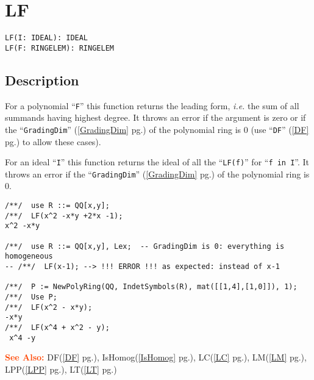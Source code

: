 \documentclass[a4paper]{mybook}
\newenvironment{command}{}{} %
\newcommand\SeeAlso{\par\textcolor{OrangeRed}{\textbf{\large See Also: }}}
\begin{document}
\section{LF}
\label{LF}
\begin{command} %


\begin{Verbatim}[label=syntax, rulecolor=\color{MidnightBlue},
frame=single]
LF(I: IDEAL): IDEAL
LF(F: RINGELEM): RINGELEM
\end{Verbatim}


\subsection*{Description}

For a polynomial ``\verb&F&'' this function returns the leading form, \textit{i.e.} the
sum of all summands having highest degree.  It throws an error if the
argument is zero or if the ``\verb&GradingDim&'' (\ref{GradingDim} pg.\pageref{GradingDim}) of the polynomial
ring is 0 (use ``\verb&DF&'' (\ref{DF} pg.\pageref{DF}) to allow these cases).
\par 
For an ideal ``\verb&I&'' this function returns the ideal of all the ``\verb&LF(f)&''
for ``\verb&f in I&''.  It throws an error if the ``\verb&GradingDim&'' (\ref{GradingDim} pg.\pageref{GradingDim}) of the polynomial
ring is 0.
\begin{Verbatim}[label=example, rulecolor=\color{PineGreen}, frame=single]
/**/  use R ::= QQ[x,y];
/**/  LF(x^2 -x*y +2*x -1);
x^2 -x*y

/**/  use R ::= QQ[x,y], Lex;  -- GradingDim is 0: everything is homogeneous
-- /**/  LF(x-1); --> !!! ERROR !!! as expected: instead of x-1

/**/  P := NewPolyRing(QQ, IndetSymbols(R), mat([[1,4],[1,0]]), 1);
/**/  Use P;
/**/  LF(x^2 - x*y);
-x*y
/**/  LF(x^4 + x^2 - y);
 x^4 -y
\end{Verbatim}


\SeeAlso %
  DF(\ref{DF} pg.\pageref{DF}), 
    IsHomog(\ref{IsHomog} pg.\pageref{IsHomog}), 
    LC(\ref{LC} pg.\pageref{LC}), 
    LM(\ref{LM} pg.\pageref{LM}), 
    LPP(\ref{LPP} pg.\pageref{LPP}), 
    LT(\ref{LT} pg.\pageref{LT})
\end{command} %
\end{document}
